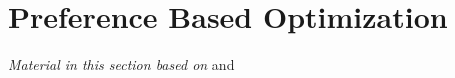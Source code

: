 \chapter{Preference Based Optimization}\label{sec:preference_optimization}

\graphicspath{{chapters/preference_optimization/figures/}}

\emph{Material in this section based on}
\citet{thatte2017sample}\cite{thatte2017sample} and
\citet{thatte2018method}\cite{thatte2018method} 
\linebreak










